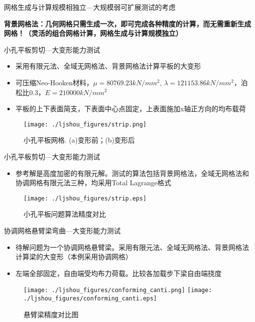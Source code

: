 \documentclass[mathserif]{beamer}
\begin{document}
\begin{CJK}{UTF8}{gkai}
\begin{frame}{网格生成与计算规模相独立—大规模弱可扩展测试的考虑}
    \begin{block}{}
    	\color{red}\bf 背景网格法：几何网格只需生成一次，即可完成各种精度的计算，而无需重新生成网格！（灵活的组合网格计算，网格生成与计算规模独立）
    \end{block}
    
\end{frame}


\begin{frame}{小孔平板剪切—大变形能力测试}
    \begin{itemize}
        \item 采用有限元法、全域无网格法、背景网格法计算平板的大变形
        \item 可压缩Neo-Hooken材料，$\mu=80769.23kN/mm^2$, $\lambda =121153.86kN/mm^2$，泊松比0.3，$E=210000kN/mm^2$
        \item 平板的上下表面简支，下表面中心点固定，上表面施加x轴正方向的均布载荷
    \end{itemize}
	\begin{figure}
		\centering
		\texttt{[image: ./ljshou\_figures/strip.png]}
		\caption{小孔平板网格. (a)变形前；(b)变形后}
	\end{figure}
\end{frame}
\begin{frame}{小孔平板剪切—大变形能力测试}
    \begin{itemize}
    \item 参考解是高度加密的有限元解。测试的算法包括背景网格法，全域无网格法和协调网格有限元法三种，均采用Total Lagrange格式
    \end{itemize}

	\begin{figure}
		\centering
		\texttt{[image: ./ljshou\_figures/strip.eps]}
		\caption{小孔平板问题算法精度对比}
	\end{figure}
\end{frame}



\begin{frame}{协调网格悬臂梁弯曲—大变形能力测试}
    \begin{itemize}
    \item 待解问题为一个协调网格悬臂梁。采用有限元法、全域无网格法、背景网格法计算梁的大变形（本例采用协调网格）
    \item 左端全部固定，自由端受均布力荷载。比较各加载步下梁自由端挠度
    \end{itemize}
	\begin{figure}
		\centering
		\texttt{[image: ./ljshou\_figures/conforming\_canti.png]}
		\texttt{[image: ./ljshou\_figures/conforming\_canti.eps]}
		\caption{悬臂梁精度对比图}
	\end{figure}
\end{frame}




\end{CJK}
\end{document}

